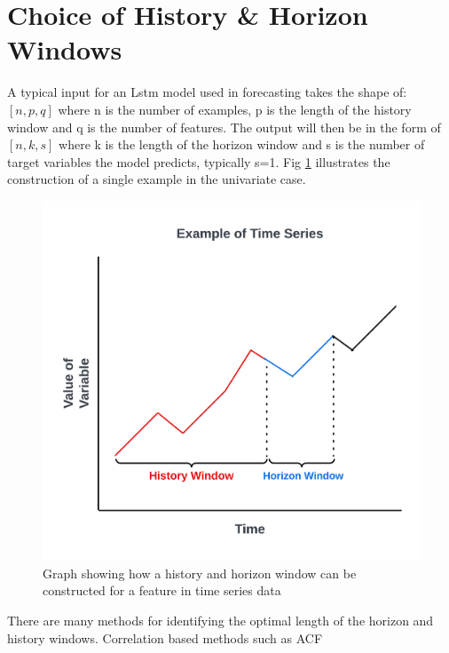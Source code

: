 \section{Choice of History \& Horizon Windows}
A typical input for an Lstm model used in forecasting takes the shape of: $[ n, p, q ]$ where n is the number of examples, p is the length of the history window and q is the number of features. The output will then be in the form of $[n, k, s ]$ where k is the length of the horizon window and s is the number of target variables the model predicts, typically s=1. Fig \ref{fig:example_of_ts} illustrates the construction of a single example in the univariate case.

\begin{figure}[h]
\includegraphics[scale=0.15]{History Horizon.png}
\caption{Graph showing how a history and horizon window can be constructed for a feature in time series data}
\label{fig:example_of_ts}
\end{figure}

There are many methods for identifying the optimal length of the horizon and history windows. Correlation based methods such as ACF 

